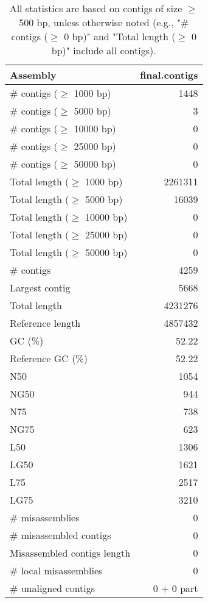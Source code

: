 \documentclass[12pt,a4paper]{article}
\begin{document}
\begin{table}[ht]
\begin{center}
\caption{All statistics are based on contigs of size $\geq$ 500 bp, unless otherwise noted (e.g., "\# contigs ($\geq$ 0 bp)" and "Total length ($\geq$ 0 bp)" include all contigs).}
\begin{tabular}{|l*{1}{|r}|}
\hline
Assembly & final.contigs \\ \hline
\# contigs ($\geq$ 1000 bp) & 1448 \\ \hline
\# contigs ($\geq$ 5000 bp) & 3 \\ \hline
\# contigs ($\geq$ 10000 bp) & 0 \\ \hline
\# contigs ($\geq$ 25000 bp) & 0 \\ \hline
\# contigs ($\geq$ 50000 bp) & 0 \\ \hline
Total length ($\geq$ 1000 bp) & 2261311 \\ \hline
Total length ($\geq$ 5000 bp) & 16039 \\ \hline
Total length ($\geq$ 10000 bp) & 0 \\ \hline
Total length ($\geq$ 25000 bp) & 0 \\ \hline
Total length ($\geq$ 50000 bp) & 0 \\ \hline
\# contigs & 4259 \\ \hline
Largest contig & 5668 \\ \hline
Total length & 4231276 \\ \hline
Reference length & 4857432 \\ \hline
GC (\%) & 52.22 \\ \hline
Reference GC (\%) & 52.22 \\ \hline
N50 & 1054 \\ \hline
NG50 & 944 \\ \hline
N75 & 738 \\ \hline
NG75 & 623 \\ \hline
L50 & 1306 \\ \hline
LG50 & 1621 \\ \hline
L75 & 2517 \\ \hline
LG75 & 3210 \\ \hline
\# misassemblies & 0 \\ \hline
\# misassembled contigs & 0 \\ \hline
Misassembled contigs length & 0 \\ \hline
\# local misassemblies & 0 \\ \hline
\# unaligned contigs & 0 + 0 part \\ \hline

\end{tabular}
\end{center}
\end{table}
\end{document}
